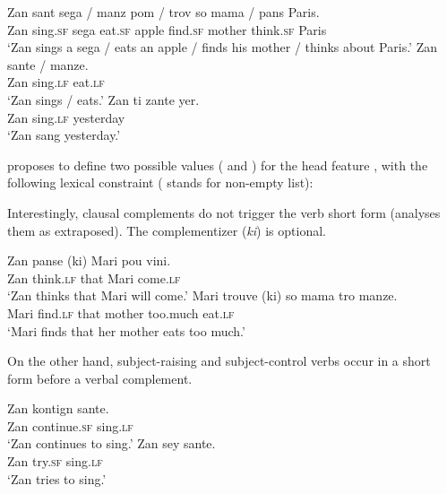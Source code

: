 \documentclass[output=paper
	        ,collection
	        ,collectionchapter
 	        ,biblatex
                ,babelshorthands
                ,newtxmath
                ,draftmode
                ,colorlinks, citecolor=brown
]{langscibook}
\begin{document}
\begin{exe}
\ex \begin{xlist}
\ex 
\gll Zan sant sega / manz pom / trov so mama / pans Paris. \\
     Zan sing.\textsc{sf} sega {} eat.\textsc{sf} apple {} find.\textsc{sf} \POSS{} mother {} think.\textsc{sf} Paris \\
\glt `Zan sings a sega / eats an apple / finds his mother / thinks about Paris.'	
\ex 
\gll Zan sante / manze.\\
     Zan sing.\textsc{lf} {} eat.\textsc{lf}\\
\glt `Zan sings / eats.'
\ex 
\gll Zan ti zante yer. \\
Zan  \PRF{} sing.\textsc{lf} yesterday\\
\glt `Zan sang yesterday.'
\end{xlist}
\end{exe}


\citet{Henri2010} proposes to define two possible values ( and ) for the head
feature \vform, with the following lexical constraint ( stands for non-empty list):

\begin{exe}       
\ex
{}
\end{exe}
Interestingly, clausal complements do not trigger the verb short form (\citet{Henri2010}\addpages analyses them as extraposed). The complementizer (\emph{ki}) is optional.

\eal
\ex 
\gll Zan panse             (ki)               Mari pou    vini.\\
     Zan think.\textsc{lf} that Mari \FUT{} come.\textsc{lf}\\
\glt `Zan thinks that Mari will come.'
\ex 
\gll Mari trouve           (ki)                so      mama   tro      manze.\\
     Mari find.\textsc{lf} that  \POSS{} mother too.much eat.\textsc{lf}\\
\glt `Mari finds that her mother eats too much.'
\zl

On the other hand, subject-raising and subject-control verbs occur in a short form before a verbal complement.

\begin{exe}
\ex \begin{xlist}
\ex \gll Zan kontign sante.\\
Zan continue.\textsc{sf} sing.\textsc{lf}\\
\glt `Zan continues to sing.'
\ex \gll Zan sey sante.\\
Zan try.\textsc{sf} sing.\textsc{lf}\\
\glt `Zan tries to sing.'
\end{xlist}
\end{exe}
\end{document}

